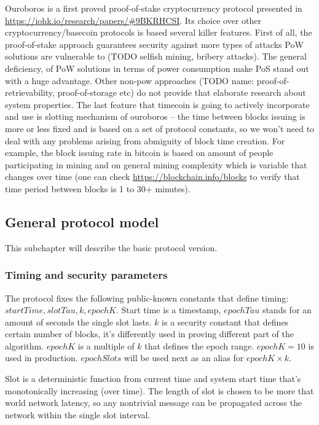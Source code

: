 \documentclass[]{itmo-student-thesis}
\begin{document}
Ouroboros is a first proved proof-of-stake cryptocurrency protocol
presented in \url{https://iohk.io/research/papers/#9BKRHCSI}. Its
choice over other cryptocurrency/basecoin protocols is based several
killer features. First of all, the proof-of-stake approach guarantees
security against more types of attacks PoW solutions are vulnerable to
(TODO selfish mining, bribery attacks). The general deficiency, of PoW
solutions in terms of power consumption make PoS stand out with a huge
advantage. Other non-pow approaches (TODO name:
proof-of-retrievability, proof-of-storage etc) do not provide that
elaborate research about system properties. The last feature that
timecoin is going to actively incorporate and use is slotting
mechanism of ouroboros -- the time between blocks issuing is more or
less fixed and is based on a set of protocol constants, so we won’t
need to deal with any problems arising from abmiguity of block time
creation. For example, the block issuing rate in bitcoin is based on
amount of people participating in mining and on general mining
complexity which is variable that changes over time (one can check
\url{https://blockchain.info/blocks} to verify that time period between
blocks is 1 to 30+ minutes).

\subsection{General protocol model}

This subchapter will describe the basic protocol version.

\subsubsection{Timing and security parameters}

The protocol fixes the following public-known constants that define
timing: $startTime, slotTau, k, epochK$. Start time is a timestamp,
$epochTau$ stands for an amount of seconds the single slot lasts. $k$ is
a security constant that defines certain number of blocks, it’s
differently used in proving different part of the algorithm. $epochK$
is a multiple of $k$ that defines the epoch range. $epochK = 10$ is
used in production. $epochSlots$ will be used next as an alias for
$epochK \times k$.

Slot is a deterministic function from current time and system start
time that’s monotonically increasing (over time). The length of slot
is chosen to be more that world network latency, so any nontrivial
message can be propagated across the network within the single slot
interval.
\end{document}
